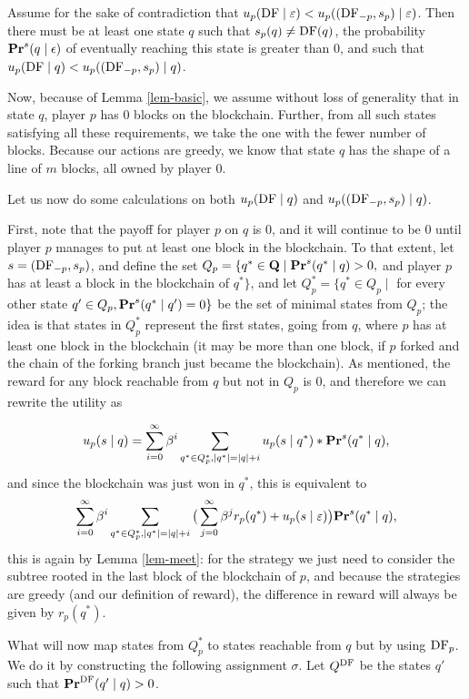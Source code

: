 Assume for the sake of contradiction that $u_p(\text{\rm DF} \mid \varepsilon) < u_p( (\text{\rm DF}_{-p},s_p) \mid \varepsilon)$. Then there must be at least one 
state $q$ such that $s_p(q) \neq \text{\rm DF}(q)$, the probability $\mathbf{Pr}^s(q \mid \epsilon)$ of eventually reaching this state is greater than $0$, and such that $u_p(\text{\rm DF} \mid q) < u_p( (\text{\rm DF}_{-p},s_p) \mid q)$. 


Now, because of Lemma \ref{lem-basic}, we assume without loss of generality that in state $q$, player $p$ has $0$ blocks on the blockchain. Further, from all such states satisfying all these requirements, we take the one with the fewer number of blocks. Because our actions are greedy, we know that state $q$ has the shape of a line of $m$ blocks, all owned by player $0$. 

Let us now do some calculations on both $u_p(\text{\rm DF} \mid q)$ and $u_p( (\text{\rm DF}_{-p},s_p) \mid q)$. 
\medskip

First, note that the payoff for player $p$ on $q$ is $0$, and it will continue to be $0$ until player $p$ manages to put at least one block in the blockchain. To that extent, let $s = (\text{\rm DF}_{-p},s_p)$, and define the set 
$Q_p = \{q^* \in \mathbf{Q} \mid \mathbf{Pr}^s(q^* \mid q) > 0, $ and player $p$ has at least a block in the blockchain of $q^* \}$, 
and let $Q^*_p=\{q^* \in Q_p \mid$ for every other state $q' \in Q_p, \mathbf{Pr}^s(q^* \mid q')=0 \}$ be the set of minimal states from $Q_p$; 
the idea is that states in $Q^*_p$ represent the first states, going from $q$, where $p$ has at least one block in the blockchain 
(it may be more than one block, if $p$ forked and the chain of the forking branch just became the blockchain). 
As mentioned, the reward for any block reachable from $q$ but not in $Q_p$ is $0$, and therefore we can rewrite the utility as

$$u_p( s \mid q) = \sum_{i=0}^\infty \beta^i \sum_{q^* \in Q^*_p, |q^*| = |q| + i} u_p(s \mid q^*) * \mathbf{Pr}^s(q^* \mid q), $$
and since the blockchain was just won in $q^*$, %
this is equivalent to 
$$ \sum_{i=0}^\infty \beta^i \sum_{q^* \in Q^*_p, |q^*| = |q| + i} \big(\sum_{j = 0}^\infty \beta^j r_p(q^*) + u_p(s \mid \varepsilon) \big) \mathbf{Pr}^s(q^* \mid q), $$
this is again by Lemma \ref{lem-meet}: for the strategy we just need to consider the subtree rooted in the last block of the blockchain of $p$, and 
because the strategies are greedy (and our definition of reward), the difference in reward will always be given by $r_p(q^*)$. 

What will now map states from $Q^*_p$ to states reachable from $q$ but by using $\text{\rm DF}_p$. We do it by constructing the following assignment $\sigma$.
Let $Q^{\text{\rm DF}}$ be the states $q'$ such that $\mathbf{Pr}^{\text{\rm DF}}(q' \mid q) > 0$. 

